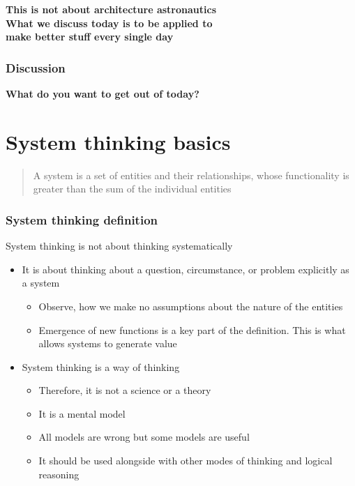 \documentclass[10pt, compress]{beamer}
\begin{document}
\begin{frame}[fragile]
  
  \begin{center}
  	\textbf{This is not about architecture astronautics\\[4mm] \large{What we discuss today is to be applied to \\make better stuff every single day}}
  \end{center}
\end{frame}


\begin{frame}[fragile]
  \frametitle{Discussion}
		\begin{center}
			\textbf{What do you want to get out of today?}
		\end{center}
\end{frame}

\section{System thinking basics}
\begin{frame}[fragile]
	\begin{center}
		\begin{quote}
			A system is a set of entities and their relationships, whose functionality is greater than the sum of the individual entities
		\end{quote}
	\end{center}
		\cite{crawley2015systems}
\end{frame}


\begin{frame}[fragile]
  \frametitle{System thinking definition}
  System thinking is not about thinking systematically
  	\begin{itemize}
  		\item It is about thinking about a question, circumstance, or problem explicitly as a system
		\begin{itemize}
			\item Observe, how we make no assumptions about the nature of the entities
			\item Emergence of new functions is a key part of the definition. This is what allows systems to generate value
		\end{itemize}
		\item System thinking is a way of thinking
		\begin{itemize}
			\item Therefore, it is not a science or a theory
			\item It is a mental model
			\item All models are wrong but some models are useful \citep{box1976science}
			\item It should be used alongside with other modes of thinking and logical reasoning 
		\end{itemize}		
	\end{itemize}
\end{frame}
\end{document}
